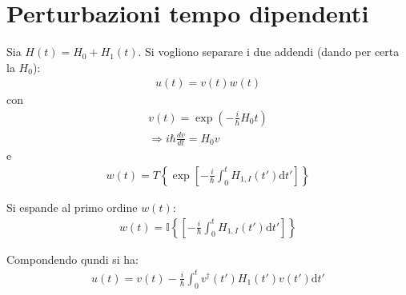 \chapter{Perturbazioni tempo dipendenti} %
Sia $H\left(t\right)=H_0+H_1\left(t\right)$. Si vogliono separare i due addendi (dando per certa la $H_0$):
\begin{equation}\begin{split}
u\left(t\right)=v\left(t\right)w\left(t\right)
\end{split}\end{equation}
con
\begin{equation}\begin{split}
v\left(t\right)=\exp{\left(-\frac{i}{\hbar }H_0t\right)} \\
\Longrightarrow i\hbar \frac{dv}{dt}=H_0v
\end{split}\end{equation}
e
\begin{equation}\begin{split}
w\left(t\right)=T\left\{\exp{\left[-\frac{i}{\hbar }\int_0^t{H_{1,I}\left(t'\right)\textrm{d}t'}\right]}\right\}
\end{split}\end{equation}


Si espande al primo ordine $w\left(t\right)$:
\begin{equation}\begin{split}
w\left(t\right)=\mathbb{I}\left\{\left[-\frac{i}{\hbar }\int_0^t{H_{1,I}\left(t'\right)\textrm{d}t'}\right]\right\}
\end{split}\end{equation}

Compondendo qundi si ha:
\begin{equation}\begin{split}
u\left(t\right)=v\left(t\right)-\frac{i}{\hbar }\int_0^t{v^{\dag}\left(t'\right)H_1\left(t'\right)v\left(t'\right)\textrm{d}t'}
\end{split}\end{equation}

